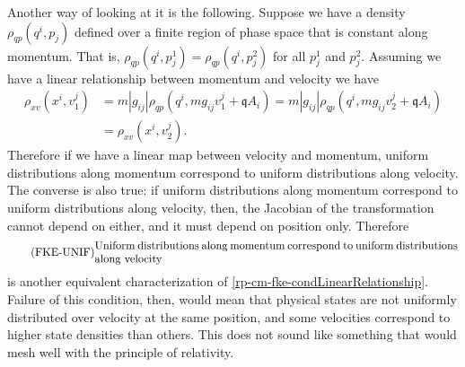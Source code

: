 Another way of looking at it is the following. Suppose we have a density $\rho_{qp}(q^i, p_j)$ defined over a finite region of phase space that is constant along momentum. That is, $\rho_{qp}(q^i, p^1_j) = \rho_{qp}(q^i, p^2_j)$ for all $p^1_j$ and $p^2_j$. Assuming we have a linear relationship between momentum and velocity we have
\begin{equation}
	\begin{aligned}
		\rho_{xv}(x^i, v_1^j) &= m |g_{ij}| \rho_{qp}(q^i, m g_{ij}v_1^j + \mathfrak{q} A_i) = m |g_{ij}| \rho_{qp}(q^i, m g_{ij}v_2^j + \mathfrak{q} A_i) \\
		&= \rho_{xv}(x^i, v_2^j).
	\end{aligned}
\end{equation}
Therefore if we have a linear map between velocity and momentum, uniform distributions along momentum correspond to uniform distributions along velocity. The converse is also true: if uniform distributions along momentum correspond to uniform distributions along velocity, then, the Jacobian of the transformation cannot depend on either, and it must depend on position only. Therefore
\begin{equation}
	\tag{FKE-UNIF}\label{rp-cm-fke-condUniformDistributions}
	\eqtext{Uniform distributions along momentum correspond to uniform distributions along velocity}
\end{equation}
is another equivalent characterization of \ref{rp-cm-fke-condLinearRelationship}. Failure of this condition, then, would mean that physical states are not uniformly distributed over velocity at the same position, and some velocities correspond to higher state densities than others. This does not sound like something that would mesh well with the principle of relativity.


